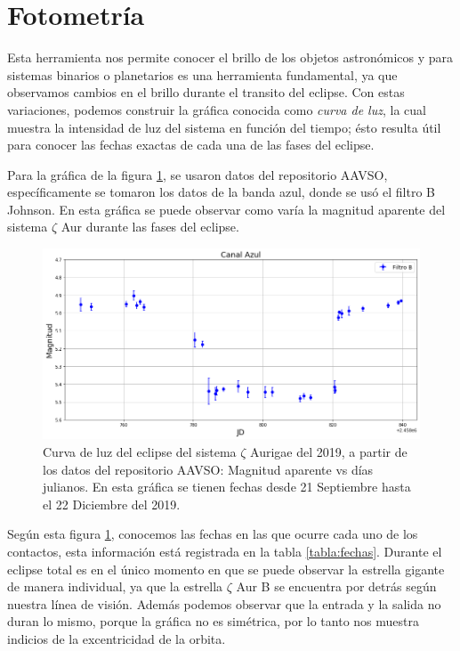 \documentclass[12pt,oneside,openany,letter]{book}
\begin{document}

\section{Fotometría}\label{sec:fotometria}
Esta herramienta nos permite conocer el brillo de los objetos astronómicos y para sistemas binarios o planetarios es una herramienta fundamental, ya que observamos cambios en el brillo durante el transito del eclipse. Con estas variaciones, podemos construir la gráfica conocida como \textit{curva de luz}, la cual muestra la intensidad de luz del sistema en función del tiempo; ésto resulta útil para conocer las fechas exactas de cada una de las fases del eclipse.
\vspace{2mm}

\noindent Para la gráfica de la figura \ref{fig:curvaluz}, se usaron datos del repositorio AAVSO, específicamente se tomaron los datos de la banda azul, donde se usó el filtro B Johnson. En esta gráfica se puede observar como varía la magnitud aparente del sistema $\zeta$ Aur durante las fases del eclipse.


\begin{figure}[h]
    \centering
    \includegraphics[width=1\linewidth]{Gaficas/curva luz.png}
    \caption[Curva de luz del eclipse del sistema $\zeta$ Aurigae del 2019.]{Curva de luz del eclipse del sistema $\zeta$ Aurigae del 2019, a partir de los datos del repositorio AAVSO: Magnitud aparente vs días julianos. En esta gráfica se tienen fechas desde 21 Septiembre hasta el 22 Diciembre del 2019.}
    \label{fig:curvaluz}
\end{figure}

\noindent Según esta figura \ref{fig:curvaluz}, conocemos las fechas en las que ocurre cada uno de los contactos, esta información está registrada en la tabla \ref{tabla:fechas}. Durante el eclipse total es en el único momento en que se puede observar la estrella gigante de manera individual, ya que la estrella $\zeta$ Aur B se encuentra por detrás según nuestra línea de visión. Además podemos observar que la entrada y la salida no duran lo mismo, porque la gráfica no es simétrica, por lo tanto nos muestra indicios de la excentricidad de la orbita.
\end{document}
